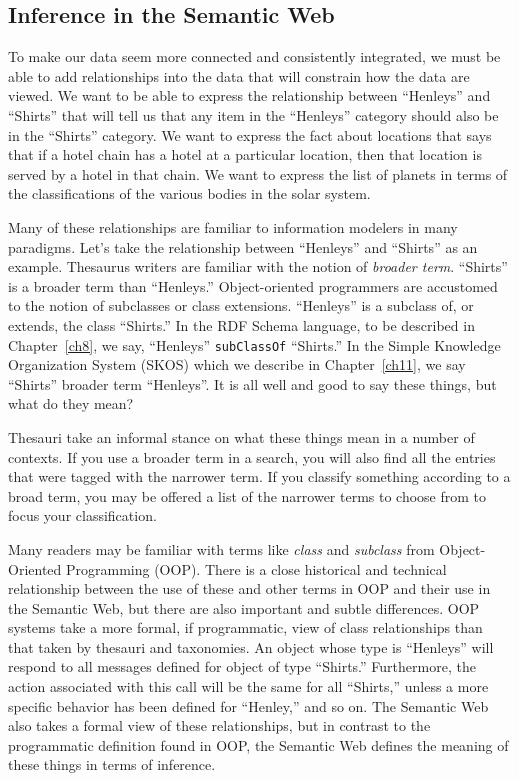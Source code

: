 \subsection{Inference in the Semantic Web}

To make our data seem more connected and consistently integrated, we
must be able to add relationships into the data that will constrain how
the data are viewed. We want to be able to express the relationship
between ``Henleys'' and ``Shirts'' that will tell us that any item in
the ``Henleys'' category should also be in the ``Shirts'' category. We
want to express the fact about locations that says that if a hotel chain
has a hotel at a particular location, then that location is served by a
hotel in that chain. We want to express the list of planets in terms of
the classifications of the various bodies in the solar system.

Many of these relationships are familiar to information modelers in many
paradigms. Let's take the relationship between ``Henleys'' and
``Shirts'' as an example. Thesaurus writers are familiar with the notion
of \emph{broader term}. ``Shirts'' is a broader term than ``Henleys.''
Object-oriented programmers are accustomed to the notion of subclasses
or class extensions. ``Henleys'' is a subclass of, or extends, the class
``Shirts.'' In the RDF Schema language, to be described in Chapter~\ref{ch8}, we say, ``Henleys'' \texttt{subClassOf} ``Shirts.''  
In the Simple Knowledge Organization System (SKOS) which we describe in Chapter~\ref{ch11}, we say ``Shirts'' broader term ``Henleys''. 
It is all well and
good to say these things, but what do they mean?

Thesauri take an informal stance on what these things mean in a number
of contexts. If you use
a broader term in a search, you will also find all the entries that were
tagged with the narrower term. If you classify something according to a
broad term, you may be offered a list of the narrower terms to choose
from to focus your classification.

\begin{sidebar}{}
Many readers may be familiar with terms like \emph{class} and
\emph{subclass} from Object-Oriented Programming (OOP). There is a close
historical and technical relationship between the use of these and other
terms in OOP and their use in the Semantic Web, but there are also
important and subtle differences. OOP systems take a more formal, if
programmatic, view of class relationships than that taken by thesauri
and taxonomies. An object whose type is ``Henleys'' will respond to all
messages defined for object of type ``Shirts.'' Furthermore, the action
associated with this call will be the same for all ``Shirts,'' unless a
more specific behavior has been defined for ``Henley,'' and so on. The
Semantic Web also takes a formal view of these relationships, but in
contrast to the programmatic definition found in OOP, the Semantic Web
defines the meaning of these things in terms of inference.
\end{sidebar}


